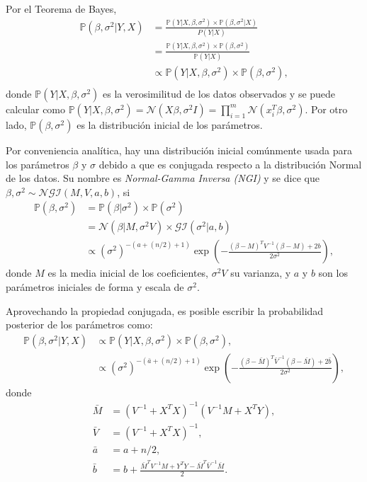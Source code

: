 Por el Teorema de Bayes,
\begin{equation*}
\begin{aligned}
    \mathbb{P}(\beta,\sigma^2 | Y, X) 
    &= \frac{\mathbb{P}(Y| X, \beta, \sigma^2) \times \mathbb{P}(\beta, \sigma^2 | X)}{P(Y | X)} \\
    &= \frac{\mathbb{P}(Y| X, \beta, \sigma^2) \times \mathbb{P}(\beta, \sigma^2)}{\mathbb{P}(Y | X)} \\
    &\propto \mathbb{P}(Y| X, \beta, \sigma^2) \times \mathbb{P}(\beta, \sigma^2), \\
\end{aligned}
\end{equation*}
donde $\mathbb{P}(Y| X, \beta, \sigma^2)$ es la verosimilitud de los datos observados y se puede calcular como $\mathbb{P}(Y| X, \beta, \sigma^2) = \mathcal{N}(X\beta,\sigma^2 I) = \prod_{i=1}^m \mathcal{N}(x_i^T\beta,\sigma^2)$. Por otro lado, $\mathbb{P}(\beta,\sigma^2)$ es la distribuci\'on inicial de los par\'ametros.

Por conveniencia anal\'itica, hay una distribuci\'on inicial com\'unmente usada para los par\'ametros $\beta$ y $\sigma$ debido a que es conjugada respecto a la distribuci\'on Normal de los datos. Su nombre es \textit{Normal-Gamma Inversa (NGI)} y se dice que $\beta,\sigma^2 \sim \mathcal{NGI}(M,V,a,b)$, si
\begin{equation*}
\begin{aligned}
    \mathbb{P}(\beta,\sigma^2) 
    &= \mathbb{P}(\beta|\sigma^2) \times \mathbb{P}(\sigma^2) \\
    &= \mathcal{N}(\beta|M, \sigma^2 V) \times \mathcal{GI}(\sigma ^2|a,b) \\
    &\propto (\sigma^2)^{-(a+(n/2)+1)} \exp\left(-\frac{(\beta-M)^TV^{-1}(\beta-M) + 2b}{2\sigma^2}\right),
\end{aligned}
\end{equation*}
donde $M$ es la media inicial de los coeficientes, $\sigma^2 V$ su varianza, y $a$ y $b$ son los par\'ametros iniciales de forma y escala de $\sigma ^2$. 

Aprovechando la propiedad conjugada, es posible escribir la probabilidad posterior de los par\'ametros como:
\begin{equation*}
\begin{aligned}
    \mathbb{P}(\beta,\sigma^2 | Y, X) 
    &\propto \mathbb{P}(Y| X, \beta, \sigma^2) \times \mathbb{P}(\beta, \sigma^2), \\
    &\propto (\sigma^2)^{-(\bar{a}+(n/2)+1)} \exp\left(-\frac{(\beta-\bar{M})^T\bar{V}^{-1}(\beta-\bar{M}) + 2\bar{b}}{2\sigma^2}\right),
\end{aligned}
\end{equation*}
donde
\begin{equation*}
\begin{aligned}
    \bar{M} &= (V^{-1} + X^TX)^{-1} (V^{-1}M + X^TY), \\
    \bar{V} &= (V^{-1} + X^TX)^{-1}, \\
    \bar{a} &= a + n/2, \\
    \bar{b} &= b + \frac{\bar{M}^TV^{-1}M + Y^TY - \bar{M}^T\bar{V}^{-1}\bar{M}}{2}.
\end{aligned}
\end{equation*}


